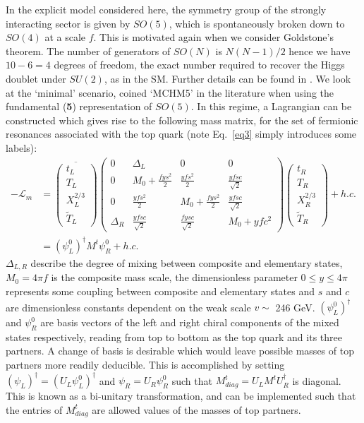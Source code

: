 \documentclass[a4paper]{jpconf}
\begin{document}
\hfill\break
In the explicit model considered here, the symmetry group of the strongly interacting sector is given by \(SO(5)\), which is spontaneously broken down to \(SO(4)\) at a scale \(f\). This is motivated again when we consider Goldstone's theorem. The number of generators of \(SO(N)\) is \(N(N-1)/2\) hence we have \(10 - 6 = 4\) degrees of freedom, the exact number required to recover the Higgs doublet under \(SU(2)\), as in the SM. Further details can be found in \cite{hlet_comp}. We look at the `minimal' scenario, coined `MCHM5' in the literature when using the fundamental (\textbf{5}) representation of \(SO(5)\). In this regime, a Lagrangian can be constructed which gives rise to the following mass matrix, for the set of fermionic resonances associated with the top quark (note Eq.~\eqref{eq3} simply introduces some labels):
\begin{align}
\label{eq2}
 -\mathcal{L}_{m} &= 
\overline{\begin{pmatrix}
t_{L} \\ T_{L} \\ X^{2/3}_{L} \\ \tilde{T}_{L}
\end{pmatrix}}
\begin{pmatrix}
0 & \Delta_{L} & 0 & 0 \\
0 & M_{0} + \frac{fys^{2}}{2} & \frac{yfs^{2}}{2} & \frac{yfsc}{\sqrt{2}} \\
0 & \frac{yfs^{2}}{2} & M_{0} + \frac{fys^{2}}{2} & \frac{yfsc}{\sqrt{2}} \\
\Delta_{R} & \frac{yfsc}{\sqrt{2}} & \frac{fysc}{\sqrt{2}} & M_{0} + yfc^{2}
\end{pmatrix}
\begin{pmatrix}
t_{R} \\ T_{R} \\ X^{2/3}_{R} \\ \tilde{T}_{R}
\end{pmatrix} + h.c. \\
\label{eq3}
&= \left(\psi_{L}^{0}\right)^\dag M^{t} \psi_{R}^{0} + h.c.	
\end{align}
\(\Delta_{L,R}\) describe the degree of mixing between composite and elementary states, \(M_{0} = 4\pi f\) is the composite mass scale, the dimensionless parameter \(0 \leq y \leq 4\pi\) represents some coupling between composite and elementary states and \(s\) and \(c\) are dimensionless constants dependent on the weak scale \(v \sim\) 246 GeV. \(\left(\psi_{L}^0\right)^\dag\) and \(\psi_{R}^0\) are basis vectors of the left and right chiral components of the mixed states respectively, reading from top to bottom as the top quark and its three partners. A change of basis is desirable which would leave possible masses of top partners more readily deducible. This is accomplished by setting \(\left(\psi_{L}\right)^\dag = \left(U_{L}\psi_{L}^{0}\right)^\dag\) and \(\psi_{R} = U_{R}\psi_{R}^{0}\) such that \(M_{diag}^{t} = U_{L}M^{t}U_{R}^\dag\) is diagonal. This is known as a bi-unitary transformation, and can be implemented such that the entries of \(M_{diag}^{t}\) are allowed values of the masses of top partners. 
\end{document}
